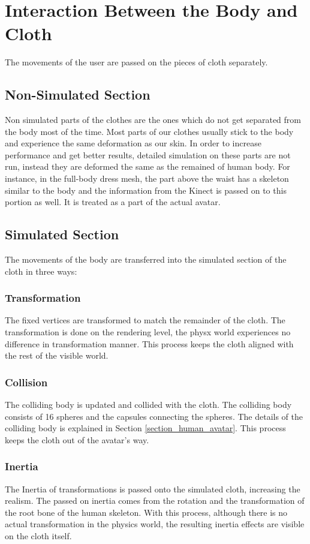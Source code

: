 \section{Interaction Between the Body and Cloth}
\label{section_body_cloth_interaction}
The movements of the user are passed on the pieces of cloth separately.

\subsection{Non-Simulated Section}
Non simulated parts of the clothes are the ones which do not get separated from the body most of the time. Most parts of our clothes usually stick to the body and experience the same deformation as our skin. In order to increase performance and get better results, detailed simulation on these parts are not run, instead they are deformed the same as the remained of human body. For instance, in the full-body dress mesh, the part above the waist has a skeleton similar to the body and the information from the Kinect is passed on to this portion as well. It is treated as a part of the actual avatar.

\subsection{Simulated Section}
The movements of the body are transferred into the simulated section of the cloth in three ways:

\subsubsection{Transformation}
The fixed vertices are transformed to match the remainder of the cloth. The transformation is done on the rendering level, the physx world experiences no difference in transformation manner. This process keeps the cloth aligned with the rest of the visible world.

\subsubsection{Collision}
The colliding body is updated and collided with the cloth. The colliding body consists of 16 spheres and the capsules connecting the spheres. The details of the colliding body is explained in Section \ref{section_human_avatar}. This process keeps the cloth out of the avatar’s way.

\subsubsection{Inertia}
The Inertia of transformations is passed onto the simulated cloth, increasing the realism. The passed on inertia comes from the rotation and the transformation of the root bone of the human skeleton. With this process, although there is no actual transformation in the physics world, the resulting inertia effects are visible on the cloth itself. 

